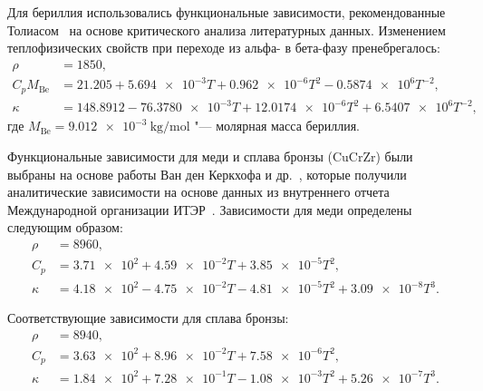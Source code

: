 Для бериллия использовались функциональные зависимости, рекомендованные Толиасом~\cite{Tolias2022} на основе критического анализа литературных данных. Изменением теплофизических свойств при переходе из альфа- в бета-фазу пренебрегалось:
\begin{subequations}
    \label{eq:app/Be_props}
    \begin{align}
        \rho              & =  \num{1850},                                                                         \\
        C_p M_\mathrm{Be} & =  \num{21.205} + \num{5.694e-3} T + \num{0.962e-6} T^2 - \num{0.5874e6} T^{-2},       \\
        \kappa            & =  \num{148.8912} - \num{76.3780e-3} T + \num{12.0174e-6} T^2 + \num{6.5407e6} T^{-2},
    \end{align}
\end{subequations}
где \( M_\mathrm{Be}=\SI{9.012e-3}{\kilogram\per\mole} \) "--- молярная масса бериллия.

Функциональные зависимости для меди и сплава бронзы (CuCrZr) были выбраны на основе работы Ван ден Керкхофа и др.~\cite{VandenKerkhof2021}, которые получили аналитические зависимости на основе данных из внутреннего отчета Международной организации ИТЭР~\cite{komarov2013thermal}. Зависимости для меди определены следующим образом:
\begin{subequations}
    \label{eq:app/Cu_props}
    \begin{align}
        \rho   & =  \num{8960},                                                             \\
        C_p    & =  \num{3.71e2} + \num{4.59e-2} T + \num{3.85e-5} T^2 ,                    \\
        \kappa & =  \num{4.18e2} - \num{4.75e-2} T - \num{4.81e-5} T^2 + \num{3.09e-8} T^3.
    \end{align}
\end{subequations}

Соответствующие зависимости для сплава бронзы:
\begin{subequations}
    \label{eq:app/CuCrZr_props}
    \begin{align}
        \rho   & =  \num{8940},                                                             \\
        C_p    & =  \num{3.63e2} + \num{8.96e-2} T + \num{7.58e-6} T^2 ,                    \\
        \kappa & = \num{1.84e2} + \num{7.28e-1} T - \num{1.08e-3} T^2 +  \num{5.26e-7} T^3.
    \end{align}
\end{subequations}

